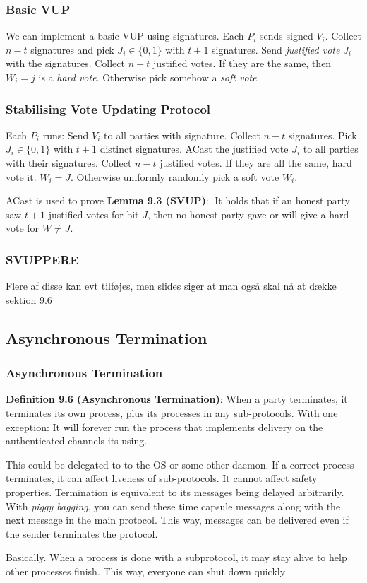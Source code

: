             \begin{frame}
                \frametitle{Basic VUP}
                    We can implement a basic VUP using signatures. Each $P_i$ sends signed $V_i$. Collect $n-t$ signatures and pick $J_i \in \{0, 1\}$ with $t+1$ signatures. Send \textit{justified vote} $J_i$ with the signatures. Collect $n-t$ justified votes. If they are the same, then $W_i = j$ is a \textit{hard vote}. Otherwise pick somehow a \textit{soft vote}. 
            \end{frame}
            \begin{frame}
                \frametitle{Stabilising Vote Updating Protocol}
                    Each $P_i$ runs: Send $V_i$ to all parties with signature. Collect $n-t$ signatures. Pick $J_i \in \{0, 1\}$ with $t+1$ distinct signatures. ACast the justified vote $J_i$ to all parties with their signatures. Collect $n-t$ justified votes. If they are all the same, hard vote it. $W_i = J$. Otherwise uniformly randomly pick a soft vote $W_i$. 

                    ACast is used to prove \textbf{Lemma 9.3 (SVUP)}:. It holds that if an honest party saw $t+1$ justified votes for bit $J$, then no honest party gave or will give a hard vote for $W \neq J$. 
            \end{frame}

            \begin{frame}
                \frametitle{SVUPPERE}
                    Flere af disse kan evt tilføjes, men slides siger at man også skal nå at dække sektion 9.6
            \end{frame}

    \subsection{Asynchronous Termination}
            \begin{frame}
                \frametitle{Asynchronous Termination}
                    \textbf{Definition 9.6 (Asynchronous Termination)}: When a party terminates, it terminates its own process, plus its processes in any sub-protocols. With one exception: It will forever run the process that implements delivery on the authenticated channels its using. 

                    This could be delegated to to the OS or some other daemon. If a correct process terminates, it can affect liveness of sub-protocols. It cannot affect safety properties. Termination is equivalent to its messages being delayed arbitrarily. With \textit{piggy bagging}, you can send these time capsule messages along with the next message in the main protocol. This way, messages can be delivered even if the sender terminates the protocol. 

                    Basically. When a process is done with a subprotocol, it may stay alive to help other processes finish. This way, everyone can shut down quickly
            \end{frame}

